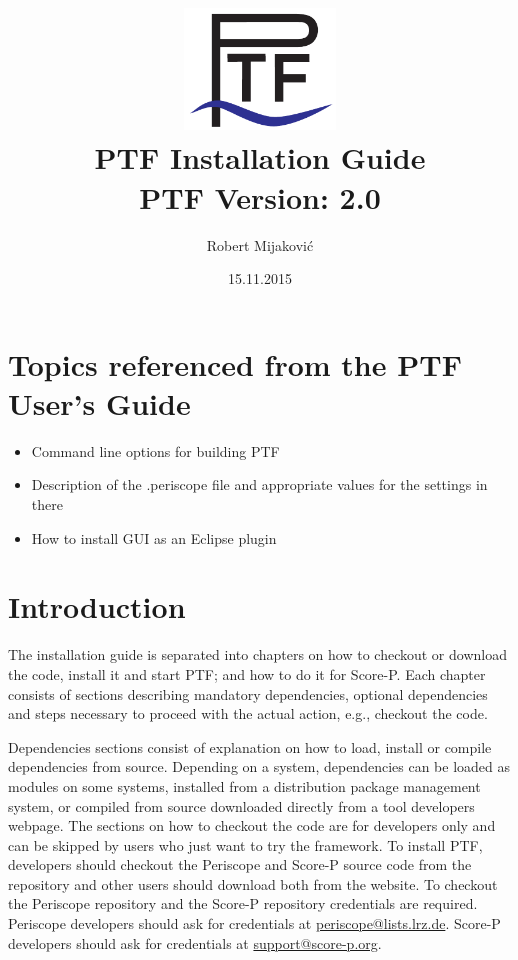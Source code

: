 \documentclass[11pt,a4paper, oneside]{book} %
\begin{document}
\title{\includegraphics[width=4cm]{images/Ptf_LogoBlau}\\ \vspace{1cm}
\textsf{\bf \huge PTF Installation Guide }\\
       \normalsize PTF Version: 2.0}
\author{Robert Mijakovi\'{c}}
\date{15.11.2015}

\maketitle
\tableofcontents

\chapter*{Topics referenced from the PTF User's Guide}
\begin{itemize}
	\item Command line options for building PTF
	\item Description of the .periscope file and appropriate values for the settings in there
	\item How to install GUI as an Eclipse plugin
\end{itemize}

\chapter{Introduction} %

The installation guide is separated into chapters on how to checkout or download
the code, install it and start PTF; and how to do it for Score-P. Each chapter
consists of sections describing mandatory dependencies, optional dependencies
and steps necessary to proceed with the actual action, e.g., checkout the code.

Dependencies sections consist of explanation on how to load, install or compile
dependencies from source. Depending on a system, dependencies can be loaded as
modules on some systems, installed from a distribution package management
system, or compiled from source downloaded directly from a tool developers
webpage.
The sections on how to checkout the code are for developers only and can be
skipped by users who just want to try the framework. To install PTF, developers
should checkout the Periscope and Score-P source code from the repository and
other users should download both from the website. To checkout the Periscope
repository and the Score-P repository credentials are required. Periscope
developers should ask for credentials at \href{mailto:periscope@lists.lrz.de}
{periscope@lists.lrz.de}. Score-P developers should ask for credentials at
\href{mailto:support@score-p.org}{support@score-p.org}.
\end{document}
